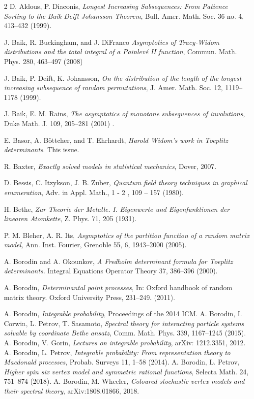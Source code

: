 \documentclass[11pt,letterpaper,reqno]{amsart}
\theoremstyle{definition}
\theoremstyle{remark}
\numberwithin{equation}{section}
\begin{document}
\begin{thebibliography}{2}
 D. Aldous,  P. Diaconis, {\it Longest Increasing Subsequences: From Patience Sorting to the Baik-Deift-Johansson Theorem},   Bull. Amer. Math. Soc. 36 no. 4,  413--432 (1999).

J. Baik, R.  Buckingham,  and J. DiFranco
{\it Asymptotics of Tracy-Widom distributions and the total integral of a Painlev\'e II function},
Commun. Math. Phys.  280,   463--497  (2008)

 J. Baik, P.  Deift,  K. Johansson, {\it On the distribution of the length of the longest increasing
subsequence of random permutations},  J. Amer. Math. Soc.  12, 1119--1178  (1999).


 J.  Baik, E. M.  Rains, {\it The asymptotics of monotone subsequences of involutions},  Duke
Math. J. 109, 205--281 (2001) .

 E. Basor, A. B\"ottcher, and T. Ehrhardt, {\it Harold Widom's work in Toeplitz determinants}.
This issue.


 R. Baxter, {\it Exactly solved models in statistical mechanics}, Dover, 2007.


 D. Bessis, C. Itzykson, J. B. Zuber, {\it Quantum field theory techniques in
graphical enumeration}, Adv. in Appl. Math., 1 - 2 , 109 -- 157 (1980).

 H. Bethe, {\it Zur Theorie der Metalle. I. Eigenwerte und Eigenfunktionen der linearen Atomkette},
Z. Phys. 71, 205 (1931).

 P. M. Bleher, A. R. Its, {\it Asymptotics of the partition function of
a random matrix model}, Ann. Inst. Fourier, Grenoble  55, 6, 1943--2000 (2005).

 A. Borodin and A. Okounkov, {\it  A Fredholm determinant formula for Toeplitz determinants.}
Integral Equations Operator Theory 37, 386--396 (2000).

A. Borodin, {\it Determinantal point processes}, In: Oxford handbook of random matrix theory. Oxford University Press, 231--249. (2011).

 A. Borodin, {\it Integrable probability}, Proceedings of the 2014 ICM.
 A. Borodin, I. Corwin, L. Petrov, T. Sasamoto, {\it Spectral theory for interacting particle systems solvable by coordinate Bethe ansatz}, Comm. Math. Phys. 339, 1167--1245 (2015).
 A. Borodin, V. Gorin, {\it Lectures on integrable probability}, arXiv: 1212.3351, 2012.
 A. Borodin, L. Petrov, {\it Integrable probability: From representation theory to Macdonald processes}, Probab. Surveys 11, 1--58 (2014).
 A. Borodin, L. Petrov, {\it Higher spin six vertex model and symmetric rational functions}, Selecta Math. 24, 751--874 (2018).
 A. Borodin, M. Wheeler, {\it Coloured stochastic vertex models and their spectral theory}, arXiv:1808.01866, 2018.







\end{thebibliography}
\end{document}
